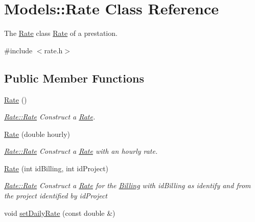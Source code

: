 \hypertarget{classModels_1_1Rate}{\section{Models\-:\-:Rate Class Reference}
\label{classModels_1_1Rate}
}


The \hyperlink{classModels_1_1Rate}{Rate} class \hyperlink{classModels_1_1Rate}{Rate} of a prestation.  




{\ttfamily \#include $<$rate.\-h$>$}

\subsection*{Public Member Functions}
\begin{DoxyCompactItemize}
\item 
\hypertarget{classModels_1_1Rate_a609460ae8c48027ed4ac1aaac416f690}{\hyperlink{classModels_1_1Rate_a609460ae8c48027ed4ac1aaac416f690}{Rate} ()}\label{classModels_1_1Rate_a609460ae8c48027ed4ac1aaac416f690}

\begin{DoxyCompactList}\small\item\em \hyperlink{classModels_1_1Rate_a609460ae8c48027ed4ac1aaac416f690}{Rate\-::\-Rate} Construct a \hyperlink{classModels_1_1Rate}{Rate}. \end{DoxyCompactList}\item 
\hyperlink{classModels_1_1Rate_ad2d770be11eb899e8bcf673ed462836e}{Rate} (double hourly)
\begin{DoxyCompactList}\small\item\em \hyperlink{classModels_1_1Rate_a609460ae8c48027ed4ac1aaac416f690}{Rate\-::\-Rate} Construct a \hyperlink{classModels_1_1Rate}{Rate} with an hourly rate. \end{DoxyCompactList}\item 
\hyperlink{classModels_1_1Rate_ab867d2b5b114df71814c742c957badd8}{Rate} (int id\-Billing, int id\-Project)
\begin{DoxyCompactList}\small\item\em \hyperlink{classModels_1_1Rate_a609460ae8c48027ed4ac1aaac416f690}{Rate\-::\-Rate} Construct a \hyperlink{classModels_1_1Rate}{Rate} for the \hyperlink{classModels_1_1Billing}{Billing} with {\itshape id\-Billing} as identify and from the project identified by {\itshape id\-Project} \end{DoxyCompactList}\item 
\hypertarget{classModels_1_1Rate_a2f07614aa1d1a4957fd8d4de4d3680d5}{void \hyperlink{classModels_1_1Rate_a2f07614aa1d1a4957fd8d4de4d3680d5}{set\-Daily\-Rate} (const double \&)}\label{classModels_1_1Rate_a2f07614aa1d1a4957fd8d4de4d3680d5}


\end{DoxyCompactItemize}
